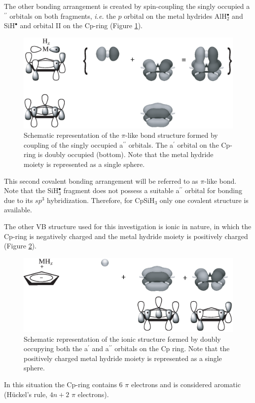 The other bonding arrangement is created by spin-coupling the singly occupied a$^{\prime\prime}$ orbitals on both fragments, \textit{i.e.} the $p$ orbital on the metal hydrides AlH$_{2}^\bullet$ and SiH$^\bullet$ and orbital II on the Cp-ring (Figure \ref{ch4.fig.pi}).
\begin{figure}[htbp]
\center
\includegraphics[scale=0.45]{cyclopentadienyl/figures/pi.eps}
\caption{Schematic representation of the $\pi$-like bond structure formed by coupling of the singly occupied a$^{\prime\prime}$ orbitals. The a$^\prime$ orbital on the Cp-ring is doubly occupied (bottom). Note that the metal hydride moiety is represented as a single sphere.}
\label{ch4.fig.pi}
\end{figure}
This second covalent bonding arrangement will be referred to as $\pi$-like bond. Note that the SiH$_{3}^\bullet$ fragment does not possess a suitable a$^{\prime\prime}$ orbital for bonding due to its $sp^3$ hybridization. Therefore, for CpSiH$_3$ only one covalent structure is available.

The other VB structure used for this investigation is ionic in nature, in which the Cp-ring is negatively charged and the metal hydride moiety is positively charged (Figure \ref{ch4.fig.ionic}).
\begin{figure}[htbp]
\center
\includegraphics[scale=0.45]{cyclopentadienyl/figures/ionic.eps}
\caption{Schematic representation of the ionic structure formed by doubly occupying both the a$^{\prime}$ and a$^{\prime\prime}$ orbitals on the Cp ring. Note that the positively charged metal hydride moiety is represented as a single sphere.}
\label{ch4.fig.ionic}
\end{figure}
In this situation the Cp-ring contains 6 $\pi$ electrons and is considered aromatic (H\"{u}ckel's rule, $4n+2$ $\pi$ electrons). 

